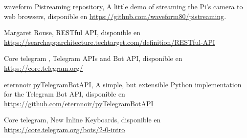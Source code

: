 \begin{thebibliography}{99}
	 waveform Pistreaming repository, A little demo of streaming the Pi's camera to web browsers, disponible en \url{https://github.com/waveform80/pistreaming}.
	
	 Margaret Rouse, RESTful API, disponible en \url{https://searchapparchitecture.techtarget.com/definition/RESTful-API}
	
	 Core telegram , Telegram APIs and Bot API, disponible en \url{https://core.telegram.org/}
	
	 eternnoir pyTelegramBotAPI, A simple, but extensible Python implementation for the Telegram Bot API, disponible en \url{https://github.com/eternnoir/pyTelegramBotAPI}
	
	
	 Core telegram, New Inline Keyboards, disponible en \url{https://core.telegram.org/bots/2-0-intro}
	
\end{thebibliography}